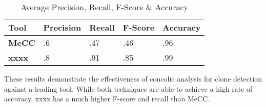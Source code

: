 \documentclass{sig-alternate}
\newif\ifisnopii
\begin{document}






\begin{table}[thb!]
\begin{center}
\caption{Average Precision, Recall, F-Score \& Accuracy}
\label{Table:precisionrecall}
\begin{tabular}{l|l|l|l|l}
\bfseries Tool & \bfseries Precision & \bfseries Recall & \bfseries F-Score & \bfseries Accuracy \\ \hline\hline
 \bfseries MeCC & .6 & .47 & .46 & .96 \\ \cline{2-5}
 \hline
 \bfseries \ifisnopii CCCD \else xxxx \fi & .8 & .91 & .85 & .99 \\
\end{tabular}

\end{center}

\end{table}


These results demonstrate the effectiveness of concolic analysis for clone detection against a leading tool. While both techniques are able to achieve a high rate of accuracy, \ifisnopii CCCD \else xxxx \fi has a much higher F-score and recall than MeCC.
\end{document}
